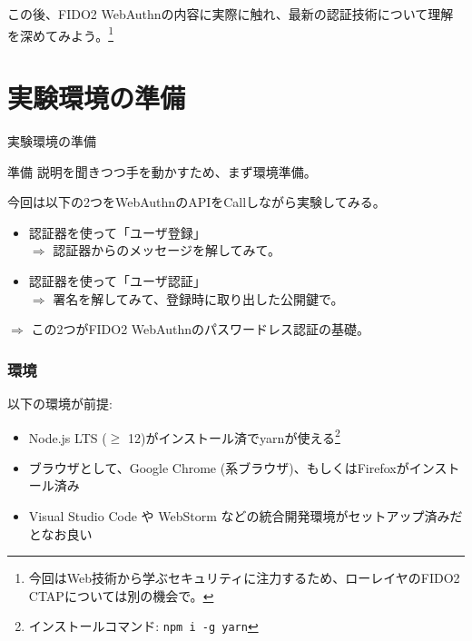 \documentclass[12pt,dvipdfmx,uplatex]{beamer}
\begin{document}
\begin{frame}
この後、FIDO2 WebAuthnの内容に実際に触れ、最新の認証技術について理解を深めてみよう。\footnote[frame]{\scriptsize 今回はWeb技術から学ぶセキュリティに注力するため、ローレイヤのFIDO2 CTAPについては別の機会で。}
\end{frame}

\section{実験環境の準備}
\begin{frame}
\centering
{\Large 実験環境の準備}
\end{frame}

\begin{frame}{準備}
説明を聞きつつ手を動かすため、まず環境準備。

\vspace{2ex}

今回は以下の2つをWebAuthnのAPIをCallしながら実験してみる。
\begin{itemize}
\item 認証器を使って「ユーザ登録」\\
$\Rightarrow$ 認証器からのメッセージを解してみて。
\item 認証器を使って「ユーザ認証」\\
$\Rightarrow$ 署名を解してみて、登録時に取り出した公開鍵で。
\end{itemize}
$\Rightarrow$ この2つが\alert{FIDO2 WebAuthnのパスワードレス認証の基礎}。
\end{frame}

\begin{frame}
\frametitle{環境}

以下の環境が前提:
\begin{itemize}
 \item Node.js LTS ($\ge$ 12)がインストール済でyarnが使える\footnote[frame]{インストールコマンド: \texttt{npm i -g yarn}}
 \item ブラウザとして、Google Chrome (系ブラウザ)、もしくはFirefoxがインストール済み
 \item Visual Studio Code や WebStorm などの統合開発環境がセットアップ済みだとなお良い
\end{itemize}
\end{frame}
\end{document}
